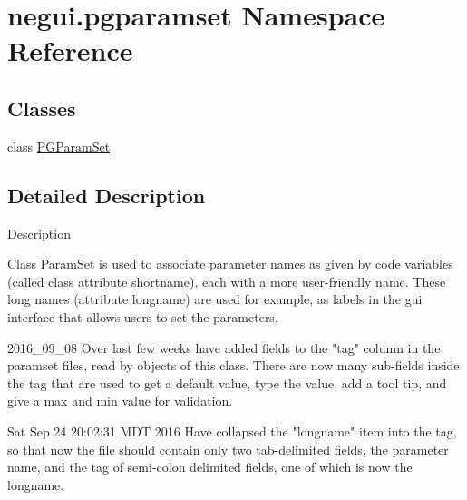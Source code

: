 \hypertarget{namespacenegui_1_1pgparamset}{}\section{negui.\+pgparamset Namespace Reference}
\label{namespacenegui_1_1pgparamset}
\subsection*{Classes}
\begin{DoxyCompactItemize}
\item 
class \hyperlink{classnegui_1_1pgparamset_1_1PGParamSet}{P\+G\+Param\+Set}
\end{DoxyCompactItemize}


\subsection{Detailed Description}
\begin{DoxyVerb}Description

Class ParamSet is used to associate
parameter names as given by code variables
(called class attribute shortname),
each with a more user-friendly
name.  These long names (attribute longname) are used
for example, as labels in the gui interface
that allows  users to set the parameters.

2016_09_08
Over last few weeks have added fields to the "tag"
column in the paramset files, read by objects of
this class.  There are now many sub-fields inside
the tag that are used to get a default value, 
type the value, add a tool tip, and give a max
and min value for validation.

Sat Sep 24 20:02:31 MDT 2016
Have collapsed the "longname" item into the tag,
so that now the file should contain only two
tab-delimited fields, the parameter name, 
and the tag of semi-colon delimited fields,
one of which is now the longname.\end{DoxyVerb}
 